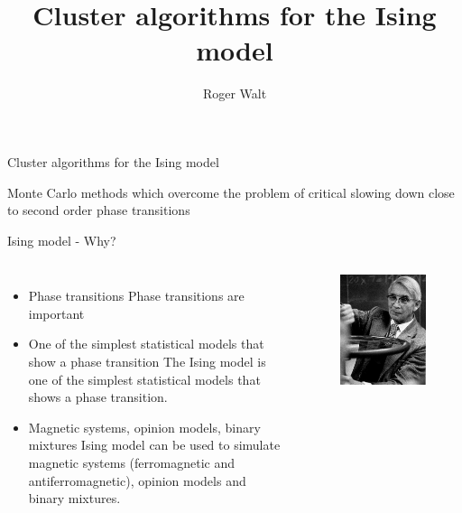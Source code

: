 \documentclass[]{beamer}
\begin{document}
\title{Cluster algorithms for the Ising model}
\author{Roger Walt}

\begin{frame}
	\huge{Cluster algorithms for the Ising model}
	\vspace*{5pt}

	\Large{Monte Carlo methods which overcome the problem of critical slowing down close to second order phase transitions}
\end{frame}

\begin{frame}{Ising model - Why?}
\begin{columns}[c]
	\begin{itemize}
		\item<1-> Phase transitions
			 {Phase transitions are important}
		\item<2-> One of the simplest statistical models that show a phase transition
			 {The Ising model is one of the simplest statistical models that shows a phase transition.}
		\item<3-> Magnetic systems, opinion models, binary mixtures
			 {Ising model can be used to simulate magnetic systems (ferromagnetic and antiferromagnetic), opinion models and binary mixtures.}
	\end{itemize}
	\pause[4]
	\begin{figure}[p]
		\centering
		\includegraphics{img/ising.jpg}

\end{figure}
\end{columns}
\end{frame}
\end{document}
